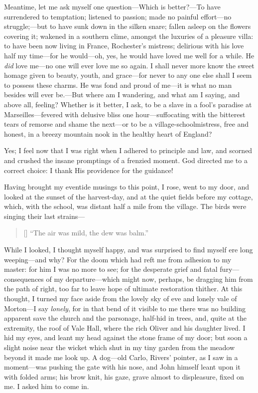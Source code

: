 Meantime, let me ask myself one question---Which is better?---To have
surrendered to temptation; listened to passion; made no painful
effort---no struggle;---but to have sunk down in the silken snare;
fallen asleep on the flowers covering it; wakened in a southern clime,
amongst the luxuries of a pleasure villa: to have been now living in
France, \Mr{} Rochester's mistress; delirious with his love half my
time---for he would---oh, yes, he would have loved me well for a while. 
He \emph{did} love me---no one will ever love me so again. I shall
never more know the sweet homage given to beauty, youth, and grace---for
never to any one else shall I seem to possess these charms. He was fond
and proud of me---it is what no man besides will ever be.---But where am
I wandering, and what am I saying, and above all, feeling? Whether is
it better, I ask, to be a slave in a fool's paradise at
Marseilles---fevered with delusive bliss one hour---suffocating with the
bitterest tears of remorse and shame the next---or to be a
village-schoolmistress, free and honest, in a breezy mountain nook in
the healthy heart of England?

Yes; I feel now that I was right when I adhered to principle and law,
and scorned and crushed the insane promptings of a frenzied moment. God
directed me to a correct choice: I thank His providence for the
guidance!

Having brought my eventide musings to this point, I rose, went to my
door, and looked at the sunset of the harvest-day, and at the quiet
fields before my cottage, which, with the school, was distant half a
mile from the village. The birds were singing their last strains---

\begin{verse}[\versewidth]
\enquote{The air was mild, the dew was balm.}
\end{verse}

While I looked, I thought myself happy, and was surprised to find myself
ere long weeping---and why? For the doom which had reft me from
adhesion to my master: for him I was no more to see; for the desperate
grief and fatal fury---consequences of my departure---which might now,
perhaps, be dragging him from the path of right, too far to leave hope
of ultimate restoration thither. At this thought, I turned my face
aside from the lovely sky of eve and lonely vale of Morton---I say
\emph{lonely}, for in that bend of it visible to me there was no
building apparent save the church and the parsonage, half-hid in trees,
and, quite at the extremity, the roof of Vale Hall, where the rich \Mr{}
Oliver and his daughter lived. I hid my eyes, and leant my head against
the stone frame of my door; but soon a slight noise near the wicket
which shut in my tiny garden from the meadow beyond it made me look up. 
A dog---old Carlo, \Mr{} Rivers' pointer, as I saw in a moment---was
pushing the gate with his nose, and \St{} John himself leant upon it with
folded arms; his brow knit, his gaze, grave almost to displeasure, fixed
on me. I asked him to come in.

